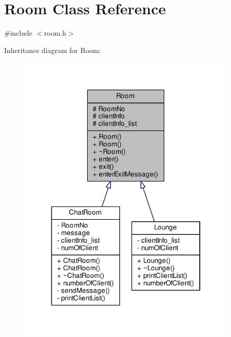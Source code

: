\hypertarget{class_room}{}\section{Room Class Reference}
\label{class_room}


{\ttfamily \#include $<$room.\+h$>$}



Inheritance diagram for Room\+:
\nopagebreak
\begin{figure}[H]
\begin{center}
\leavevmode
\includegraphics[width=298pt]{class_room__inherit__graph}
\end{center}
\end{figure}


